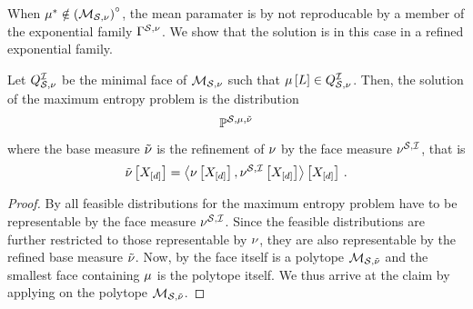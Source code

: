 When $\mu^*\notin{\left(\mathcal{M}_{\mathcal{S},\nu}\right)}^{\circ}$, the mean paramater is by  not reproducable by a member of the exponential family $\Gamma^{\mathcal{S},\nu}$.
We show that the solution is in this case in a refined exponential family.

\begin{theorem}
    \label{the:maxEntropyFace}
    Let $Q^{\mathcal{I}}_{\mathcal{S},\nu}$ be the minimal face of $\mathcal{M}_{\mathcal{S},\nu}$ such that $\mu\left[L\right]\in Q^{\mathcal{I}}_{\mathcal{S},\nu}$.
    Then, the solution of the maximum entropy problem is the distribution
    \begin{align*}
        \mathbb{P}^{\mathcal{S},\mu,\tilde{\nu}}
    \end{align*}
    where the base measure $\tilde{\nu}$ is the refinement of $\nu$ by the face measure $\nu^{\mathcal{S},\mathcal{I}}$, that is
    \begin{align*}
        \tilde{\nu}\left[X_{[d]}\right] = \left\langle \nu\left[X_{[d]}\right],\nu^{\mathcal{S},\mathcal{I}}\left[X_{[d]}\right]\right\rangle \left[ X_{[d]} \right] \, .
    \end{align*}
\end{theorem}
\begin{proof}
    By  all feasible distributions for the maximum entropy problem have to be representable by the face measure $\nu^{\mathcal{S},\mathcal{I}}$.
    Since the feasible distributions are further restricted to those representable by $\nu$, they are also representable by the refined base measure $\tilde{\nu}$.
    Now, by  the face itself is a polytope $\mathcal{M}_{\mathcal{S},\tilde{\nu}}$ and the smallest face containing $\mu$ is the polytope itself.
    We thus arrive at the claim by applying  on the polytope $\mathcal{M}_{\mathcal{S},\tilde{\nu}}$.
\end{proof}


